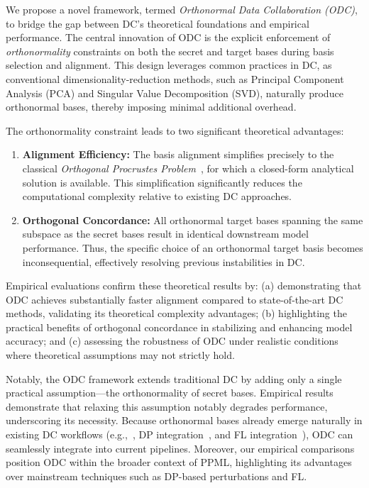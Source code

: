 \documentclass[final,3p,times]{elsarticle}
\theoremstyle{plain}
\begin{document}
We propose a novel framework, termed \textit{Orthonormal Data Collaboration (ODC)}, to bridge the gap between DC's theoretical foundations and empirical performance. The central innovation of ODC is the explicit enforcement of \textit{orthonormality} constraints on both the secret and target bases during basis selection and alignment. This design leverages common practices in DC, as conventional dimensionality-reduction methods, such as Principal Component Analysis (PCA) and Singular Value Decomposition (SVD), naturally produce orthonormal bases, thereby imposing minimal additional overhead.

The orthonormality constraint leads to two significant theoretical advantages:

\begin{enumerate}

    \item \textbf{Alignment Efficiency:} The basis alignment simplifies precisely to the classical \textit{Orthogonal Procrustes Problem}~\cite{procrustessolution}, for which a closed-form analytical solution is available. This simplification significantly reduces the computational complexity relative to existing DC approaches.

    \item \textbf{Orthogonal Concordance:} All orthonormal target bases spanning the same subspace as the secret bases result in identical downstream model performance. Thus, the specific choice of an orthonormal target basis becomes inconsequential, effectively resolving previous instabilities in DC.

\end{enumerate}

Empirical evaluations confirm these theoretical results by: (a) demonstrating that ODC achieves substantially faster alignment compared to state-of-the-art DC methods, validating its theoretical complexity advantages; (b) highlighting the practical benefits of orthogonal concordance in stabilizing and enhancing model accuracy; and (c) assessing the robustness of ODC under realistic conditions where theoretical assumptions may not strictly hold.

Notably, the ODC framework extends traditional DC by adding only a single practical assumption—the orthonormality of secret bases. Empirical results demonstrate that relaxing this assumption notably degrades performance, underscoring its necessity. Because orthonormal bases already emerge naturally in existing DC workflows (e.g.,~\cite{NRI-DC}, DP integration~\cite{DC-DP}, and FL integration~\cite{FedDCL}), ODC can seamlessly integrate into current pipelines. Moreover, our empirical comparisons position ODC within the broader context of PPML, highlighting its advantages over mainstream techniques such as DP-based perturbations and FL.
\end{document}
